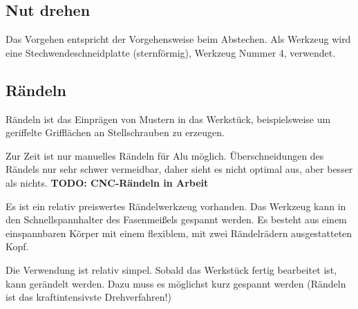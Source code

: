 \documentclass{\basedir/fablab-document}
\newcommand{\todoUnwichtig}[1]{\textbf{TODO: #1} }
\begin{document}
\subsection{Nut drehen}

Das Vorgehen entspricht der Vorgehensweise beim Abstechen.
Als Werkzeug wird eine Stechwendeschneidplatte (sternförmig), Werkzeug Nummer 4, verwendet.


\subsection{Rändeln}
\label{handdrehen:raendeln}

Rändeln ist das Einprägen von Mustern in das Werkstück, beispielsweise um geriffelte Grifflächen an Stellschrauben zu erzeugen.

Zur Zeit ist nur manuelles Rändeln für Alu möglich. Überschneidungen des Rändels nur sehr schwer vermeidbar, daher sieht es nicht optimal aus, aber besser als nichts.
\todoUnwichtig{CNC-Rändeln in Arbeit}

Es ist ein relativ preiswertes Rändelwerkzeug vorhanden.
Das Werkzeug kann in den Schnellspannhalter des Fasenmeißels gespannt werden.
Es besteht aus einem einspannbaren Körper mit einem flexiblem, mit zwei Rändelrädern ausgestatteten Kopf.

Die Verwendung ist relativ simpel.
Sobald das Werkstück fertig bearbeitet ist, kann gerändelt werden.
Dazu muss es möglichst kurz gespannt werden (Rändeln ist das kraftintensivste Drehverfahren!)
\end{document}
